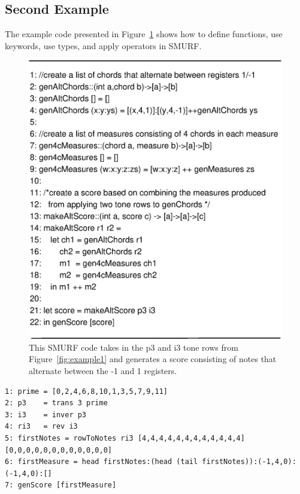 \subsection{Second Example}

The example code presented in Figure~\ref{fig:example2} shows how to define functions, use keywords, use types, and apply operators in SMURF. 

\begin{figure}
  \centering
  \includegraphics[width=\textwidth]{figures/example2}
  \caption{This SMURF code takes in the p3 and i3 tone rows from Figure~\ref{fig:example1} and generates a score consisting of notes that alternate between the -1 and 1 registers.}
  \label{fig:example2}
\end{figure}

\iffalse
\small
\begin{verbatim}
1: prime = [0,2,4,6,8,10,1,3,5,7,9,11]
2: p3    = trans 3 prime
3: i3    = inver p3
4: ri3   = rev i3
5: firstNotes = rowToNotes ri3 [4,4,4,4,4,4,4,4,4,4,4,4] [0,0,0,0,0,0,0,0,0,0,0,0]
6: firstMeasure = head firstNotes:(head (tail firstNotes)):(-1,4,0):(-1,4,0):[]
7: genScore [firstMeasure]
\end{verbatim}

